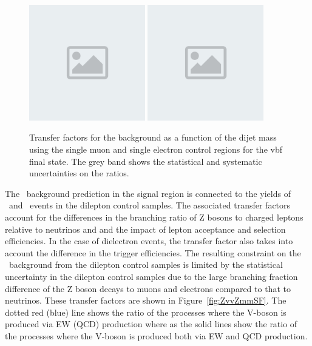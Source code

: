 \begin{figure}[htbp]
  \centering
        \includegraphics[width=0.45\textwidth]{placeholder.png}   
        \includegraphics[width=0.45\textwidth]{placeholder.png} 
  \caption{Transfer factors for the \Wlv background as a function of the dijet mass using the single muon and single electron control regions for the vbf final state. The grey band shows the statistical and systematic uncertainties on the ratios.}
    \label{fig:WMvvscalefactor}
\end{figure}


The \Zvv~background prediction in the signal region is connected to the yields of \Zmm~and \Zee~events
in the dilepton control samples. The associated transfer factors account for the differences in the
branching ratio of Z bosons to charged leptons relative to neutrinos and and the impact of lepton acceptance and selection 
efficiencies. In the case of dielectron events, the transfer factor also takes into account the 
difference in the trigger efficiencies. The resulting constraint on the \Zvv~background from the dilepton
control samples is limited by the statistical uncertainty in the dilepton control samples due to the large
branching fraction difference of the Z boson decays to muons and electrons compared to that to neutrinos.
These transfer factors are shown in Figure~\ref{fig:ZvvZmmSF}. The dotted red (blue) line shows the ratio of the processes where the V-boson
is produced via EW (QCD) production where as the solid lines show the ratio of the processes where the V-boson is produced both
via EW and QCD production.

